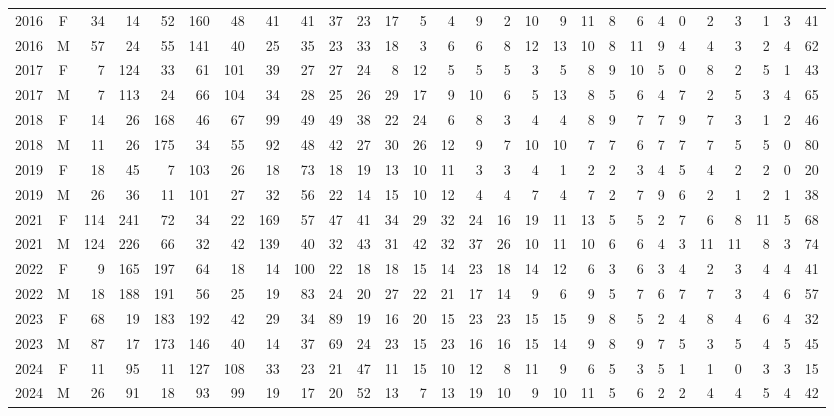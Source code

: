 \documentclass[
  english,
]{article}
\begin{document}
\begin{landscape}
\begin{longtable}{rcrrrrrrrrrrrrrrrrrrrrrrrrrr}
2016 & F & 34 & 14 & 52 & 160 & 48 & 41 & 41 & 37 & 23 & 17 & 5 & 4 & 9 & 2 & 10 & 9 & 11 & 8 & 6 & 4 & 0 & 2 & 3 & 1 & 3 & 41 \\ 
2016 & M & 57 & 24 & 55 & 141 & 40 & 25 & 35 & 23 & 33 & 18 & 3 & 6 & 6 & 8 & 12 & 13 & 10 & 8 & 11 & 9 & 4 & 4 & 3 & 2 & 4 & 62 \\ 
2017 & F & 7 & 124 & 33 & 61 & 101 & 39 & 27 & 27 & 24 & 8 & 12 & 5 & 5 & 5 & 3 & 5 & 8 & 9 & 10 & 5 & 0 & 8 & 2 & 5 & 1 & 43 \\ 
2017 & M & 7 & 113 & 24 & 66 & 104 & 34 & 28 & 25 & 26 & 29 & 17 & 9 & 10 & 6 & 5 & 13 & 8 & 5 & 6 & 4 & 7 & 2 & 5 & 3 & 4 & 65 \\ 
2018 & F & 14 & 26 & 168 & 46 & 67 & 99 & 49 & 49 & 38 & 22 & 24 & 6 & 8 & 3 & 4 & 4 & 8 & 9 & 7 & 7 & 9 & 7 & 3 & 1 & 2 & 46 \\ 
2018 & M & 11 & 26 & 175 & 34 & 55 & 92 & 48 & 42 & 27 & 30 & 26 & 12 & 9 & 7 & 10 & 10 & 7 & 7 & 6 & 7 & 7 & 7 & 5 & 5 & 0 & 80 \\ 
2019 & F & 18 & 45 & 7 & 103 & 26 & 18 & 73 & 18 & 19 & 13 & 10 & 11 & 3 & 3 & 4 & 1 & 2 & 2 & 3 & 4 & 5 & 4 & 2 & 2 & 0 & 20 \\ 
2019 & M & 26 & 36 & 11 & 101 & 27 & 32 & 56 & 22 & 14 & 15 & 10 & 12 & 4 & 4 & 7 & 4 & 7 & 2 & 7 & 9 & 6 & 2 & 1 & 2 & 1 & 38 \\ 
2021 & F & 114 & 241 & 72 & 34 & 22 & 169 & 57 & 47 & 41 & 34 & 29 & 32 & 24 & 16 & 19 & 11 & 13 & 5 & 5 & 2 & 7 & 6 & 8 & 11 & 5 & 68 \\ 
2021 & M & 124 & 226 & 66 & 32 & 42 & 139 & 40 & 32 & 43 & 31 & 42 & 32 & 37 & 26 & 10 & 11 & 10 & 6 & 6 & 4 & 3 & 11 & 11 & 8 & 3 & 74 \\ 
2022 & F & 9 & 165 & 197 & 64 & 18 & 14 & 100 & 22 & 18 & 18 & 15 & 14 & 23 & 18 & 14 & 12 & 6 & 3 & 6 & 3 & 4 & 2 & 3 & 4 & 4 & 41 \\ 
2022 & M & 18 & 188 & 191 & 56 & 25 & 19 & 83 & 24 & 20 & 27 & 22 & 21 & 17 & 14 & 9 & 6 & 9 & 5 & 7 & 6 & 7 & 7 & 3 & 4 & 6 & 57 \\ 
2023 & F & 68 & 19 & 183 & 192 & 42 & 29 & 34 & 89 & 19 & 16 & 20 & 15 & 23 & 23 & 15 & 15 & 9 & 8 & 5 & 2 & 4 & 8 & 4 & 6 & 4 & 32 \\ 
2023 & M & 87 & 17 & 173 & 146 & 40 & 14 & 37 & 69 & 24 & 23 & 15 & 23 & 16 & 16 & 15 & 14 & 9 & 8 & 9 & 7 & 5 & 3 & 5 & 4 & 5 & 45 \\ 
2024 & F & 11 & 95 & 11 & 127 & 108 & 33 & 23 & 21 & 47 & 11 & 15 & 10 & 12 & 8 & 11 & 9 & 6 & 5 & 3 & 5 & 1 & 1 & 0 & 3 & 3 & 15 \\ 
2024 & M & 26 & 91 & 18 & 93 & 99 & 19 & 17 & 20 & 52 & 13 & 7 & 13 & 19 & 10 & 9 & 10 & 11 & 5 & 6 & 2 & 2 & 4 & 4 & 5 & 4 & 42 \\ 
\bottomrule

\end{longtable}

\endgroup

\end{landscape}
\end{document}
